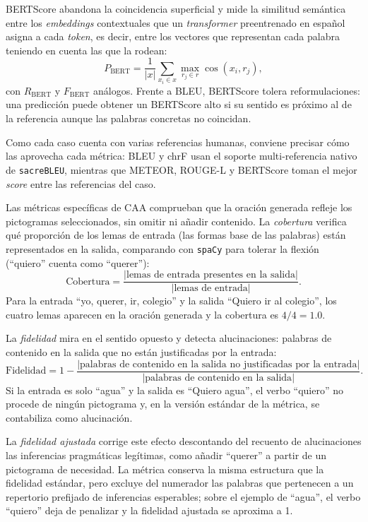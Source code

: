 BERTScore abandona la coincidencia superficial y mide la similitud semántica entre los \textit{embeddings} contextuales que un \textit{transformer} preentrenado en español asigna a cada \textit{token}, es decir, entre los vectores que representan cada palabra teniendo en cuenta las que la rodean:
\begin{equation}
P_{\text{BERT}} = \frac{1}{|x|} \sum_{x_i \in x} \max_{r_j \in r} \cos(x_i, r_j),
\end{equation}
con $R_{\text{BERT}}$ y $F_{\text{BERT}}$ análogos. Frente a BLEU, BERTScore tolera reformulaciones: una predicción puede obtener un BERTScore alto si su sentido es próximo al de la referencia aunque las palabras concretas no coincidan.

Como cada caso cuenta con varias referencias humanas, conviene precisar cómo las aprovecha cada métrica: BLEU y chrF usan el soporte multi-referencia nativo de \texttt{sacreBLEU}, mientras que METEOR, ROUGE-L y BERTScore toman el mejor \textit{score} entre las referencias del caso.

Las métricas específicas de CAA comprueban que la oración generada refleje los pictogramas seleccionados, sin omitir ni añadir contenido. La \textit{cobertura} verifica qué proporción de los lemas de entrada (las formas base de las palabras) están representados en la salida, comparando con \texttt{spaCy} para tolerar la flexión (``quiero'' cuenta como ``querer''):
\begin{equation}
\text{Cobertura} = \frac{|\text{lemas de entrada presentes en la salida}|}{|\text{lemas de entrada}|}.
\end{equation}
Para la entrada ``yo, querer, ir, colegio'' y la salida ``Quiero ir al colegio'', los cuatro lemas aparecen en la oración generada y la cobertura es $4/4 = 1.0$.

La \textit{fidelidad} mira en el sentido opuesto y detecta alucinaciones: palabras de contenido en la salida que no están justificadas por la entrada:
\begin{equation}
\text{Fidelidad} = 1 - \frac{|\text{palabras de contenido en la salida no justificadas por la entrada}|}{|\text{palabras de contenido en la salida}|}.
\end{equation}
Si la entrada es solo ``agua'' y la salida es ``Quiero agua'', el verbo ``quiero'' no procede de ningún pictograma y, en la versión estándar de la métrica, se contabiliza como alucinación.

La \textit{fidelidad ajustada} corrige este efecto descontando del recuento de alucinaciones las inferencias pragmáticas legítimas, como añadir ``querer'' a partir de un pictograma de necesidad. La métrica conserva la misma estructura que la fidelidad estándar, pero excluye del numerador las palabras que pertenecen a un repertorio prefijado de inferencias esperables; sobre el ejemplo de ``agua'', el verbo ``quiero'' deja de penalizar y la fidelidad ajustada se aproxima a 1.

